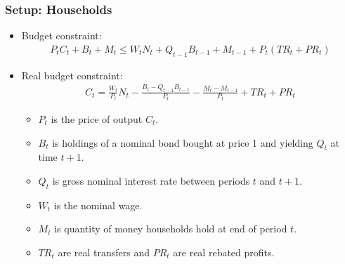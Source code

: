 \documentclass[english,xcolor=svgnames]{beamer}
\begin{document}
\begin{frame}
\frametitle{Setup: Households}
\begin{itemize}
	\item Budget constraint:
	\begin{align*}
		P_tC_t + B_{t}  + M_t  \le W_tN_t +  Q_{t-1}B_{t-1} + M_{t-1} + P_{t}(TR_t+PR_t)
	\end{align*}
	\item Real budget constraint:
	\begin{align*}
		C_{t}= \frac{W_t}{P_t} N_t -\frac{B_t-Q_{t-1}B_{t-1}}{P_{t}}-\frac{M_t-M_{t-1}}{P_{t}}+TR_t+PR_t
	\end{align*}
	\begin{itemize}
		\item $P_t$ is the price of output $C_t$.
		\item $B_{t}$ is holdings of a nominal bond bought at price 1 and yielding $Q_{t}$ at time $t+1$.
		\item $Q_{t}$ is gross nominal interest rate between periods $t$ and $t+1$.
		\item $W_t$ is the nominal wage. 
		\item $M_t$ is quantity of money households hold at end of period $t$.
		\item $TR_t$ are real transfers and $PR_t$ are real rebated profits.
	\end{itemize}
\end{itemize}
\end{frame}
\end{document}
